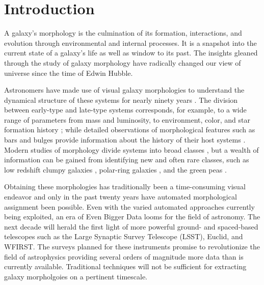 
\chapter{Introduction}
\label{chap:intro}


A galaxy's morphology is the culmination of its formation, interactions, and evolution through environmental and internal processes. It is a snapshot into the current state of a galaxy's life as well as window to its past. The insights gleaned through the study of galaxy morphology have radically changed our view of universe since the time of Edwin Hubble. 


Astronomers have made use of visual galaxy morphologies to understand the dynamical structure of these systems for nearly ninety years 
\citep[e.g.,][]{Hubble1936, 
			deVauc1959, 
			Sandage1961, 
			vandenBergh1976, 
			NairAbraham2010, 
			Baillard2011}. 
The division between early-type and late-type systems corresponds, for example, to a wide range of parameters from mass and luminosity, to environment, color, and star formation history 
\citep[e.g.,][]{Kormendy1977,  
			Dressler1980, 
			Strateva2001, 
			Blanton2003a, 
			Kauffman2003, 
			Nakamura2003, 
			Shen2003, 
			Peng2010}; 
while detailed observations of morphological features such as bars and bulges provide information about the history of their host systems 
\citep[e.g.,][]{KK04, 
			Elmegreen2008, 
			Sheth2008, 
			Masters2010, 
			Simmons2014}. 
Modern studies of morphology  divide systems into broad classes 
\citep[e.g.,][]{Conselice2006, 
			Lintott2008, 
			Kartaltepe2015, 
			Peth2016}, 
but a wealth of information can be gained from identifying new and often rare classes, such as low redshift clumpy galaxies \citep[e.g.,][]{Elmegreen2013}, polar-ring galaxies \citep[e.g.,][]{Whitmore1990}, and the green peas \citep{Cardamone2009}. 

Obtaining these morphologies has traditionally been a time-consuming visual endeavor and only in the past twenty years have automated morphological assignment been possible. Even with the varied automated approaches currently being exploited, an era of Even Bigger Data looms for the field of astronomy. The next decade will herald the first light of more powerful ground- and spaced-based telescopes such as the Large Synaptic Survey Telescope (LSST), Euclid, and WFIRST. The surveys planned for these instruments promise to revolutionize the field of astrophysics providing several orders of magnitude more data than is currently available. Traditional techniques will not be sufficient for extracting galaxy morpholgoies on a pertinent timescale. 


